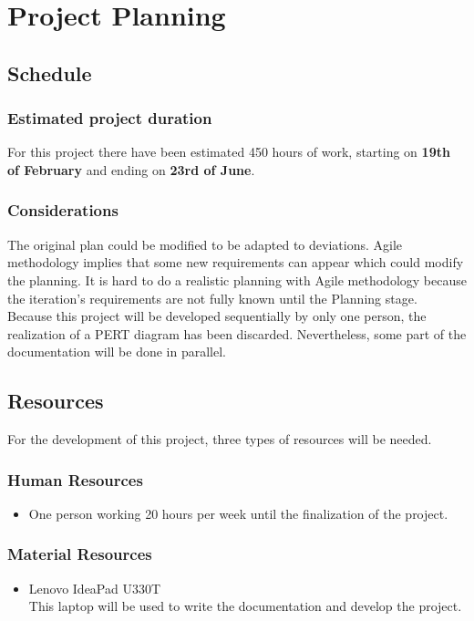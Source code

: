 \chapter{Project Planning}
\label{Chapter3}

\section{Schedule}
\subsection{Estimated project duration}
For this project there have been estimated 450 hours of work, starting on \textbf{19th of February} and ending on \textbf{23rd of June}.\\

\subsection{Considerations}
The original plan could be modified to be adapted to deviations. Agile methodology implies that some new requirements can appear which could modify the planning. It is hard to do a realistic planning with Agile methodology because the iteration's requirements are not fully known until the Planning stage.\\

Because this project will be developed sequentially by only one person, the realization of a PERT diagram has been discarded. Nevertheless, some part of the documentation will be done in parallel.

\section{Resources}
For the development of this project, three types of resources will be needed.
\subsection{Human Resources}
\begin{itemize}
	\item One person working 20 hours per week until the finalization of the project.
\end{itemize}
\subsection{Material Resources}
\begin{itemize}
	\item Lenovo IdeaPad U330T\\
	This laptop will be used to write the documentation and develop the project.
\end{itemize}
